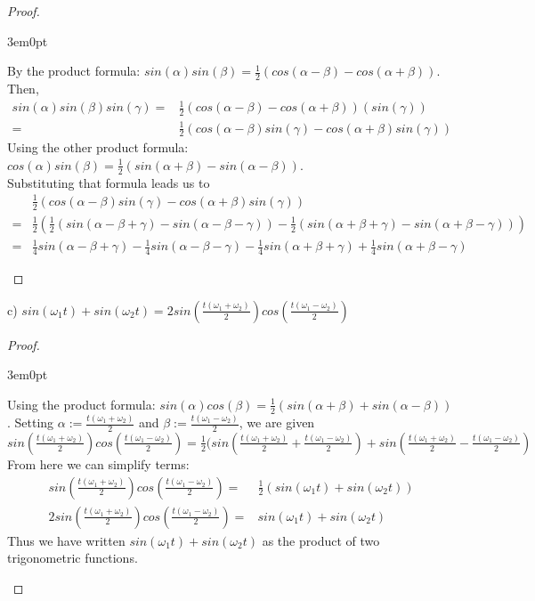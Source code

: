 \documentclass[11pt]{article}
\newcommand{\bproof}{\begin{proof}
$ $ \\
\begin{adjustwidth}{3em}{0pt}
}
\newcommand{\eproof}{\end{adjustwidth}
\end{proof}}
\begin{document}
\begin{flushleft}
\bproof

By the product formula: $sin(\alpha)sin(\beta) = \frac{1}{2}(cos( \alpha - \beta) - cos( \alpha + \beta ))$. \\
Then,
\begin{align*}
sin(\alpha)sin(\beta)sin(\gamma) = & \frac{1}{2}(cos( \alpha - \beta) - cos( \alpha + \beta ))(sin(\gamma)) \\
= & \frac{1}{2}(cos( \alpha - \beta)sin(\gamma) - cos( \alpha + \beta )sin(\gamma))
\end{align*}
Using the other product formula: $cos(\alpha)sin(\beta) = \frac{1}{2}(sin( \alpha + \beta) - sin( \alpha - \beta ))$. \\
Substituting that formula leads us to 
\begin{align*}
& \frac{1}{2}(cos( \alpha - \beta)sin(\gamma) - cos( \alpha + \beta )sin(\gamma)) \\
= & \frac{1}{2}(\frac{1}{2}(sin(\alpha - \beta + \gamma) - sin( \alpha - \beta - \gamma ))- \frac{1}{2}(sin( \alpha + \beta + \gamma ) - sin( \alpha + \beta - \gamma))) \\
= & \frac{1}{4}sin( \alpha - \beta + \gamma ) - \frac{1}{4}sin( \alpha - \beta - \gamma ) - \frac{1}{4}sin( \alpha + \beta + \gamma ) + \frac{1}{4}sin( \alpha + \beta - \gamma )
\end{align*}
\eproof

c) $sin( \omega_1 t) + sin ( \omega_2 t) = 2sin(\frac{ t (\omega_1 + \omega_2)}{2})cos(\frac{ t (\omega_1 - \omega_2)}{2})$

\bproof

Using the product formula: $sin(\alpha)cos(\beta) = \frac{1}{2}(sin( \alpha + \beta) + sin( \alpha - \beta ))$. Setting $\alpha := \frac{ t (\omega_1 + \omega_2)}{2}$ and $\beta := \frac{ t (\omega_1 - \omega_2)}{2}$, we are given $sin(\frac{ t (\omega_1 + \omega_2)}{2})cos(\frac{ t (\omega_1 - \omega_2)}{2}) = \frac{1}{2}(sin(\frac{ t (\omega_1 + \omega_2)}{2} + \frac{ t (\omega_1 - \omega_2)}{2}) + sin(\frac{ t (\omega_1 + \omega_2)}{2} - \frac{ t (\omega_1 - \omega_2)}{2}) $ \\
From here we can simplify terms:
\begin{align*}
sin(\frac{ t (\omega_1 + \omega_2)}{2})cos(\frac{ t (\omega_1 - \omega_2)}{2}) = & \frac{1}{2}(sin(\omega_1 t) + sin( \omega_2 t)) \\
2sin(\frac{ t (\omega_1 + \omega_2)}{2})cos(\frac{ t (\omega_1 - \omega_2)}{2}) = & sin(\omega_1 t) + sin( \omega_2 t)
\end{align*}
Thus we have written $sin( \omega_1 t) + sin ( \omega_2 t)$ as the product of two trigonometric functions.
\eproof


\end{flushleft}
\end{document}
